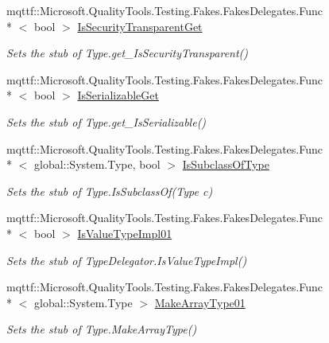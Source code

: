 \begin{DoxyCompactItemize}
mqttf\-::\-Microsoft.\-Quality\-Tools.\-Testing.\-Fakes.\-Fakes\-Delegates.\-Func\\*
$<$ bool $>$ \hyperlink{class_system_1_1_reflection_1_1_fakes_1_1_stub_type_delegator_a718557fd896385c5f7c66ffaca40c349}{Is\-Security\-Transparent\-Get}
\begin{DoxyCompactList}\small\item\em Sets the stub of Type.\-get\-\_\-\-Is\-Security\-Transparent()\end{DoxyCompactList}\item 
mqttf\-::\-Microsoft.\-Quality\-Tools.\-Testing.\-Fakes.\-Fakes\-Delegates.\-Func\\*
$<$ bool $>$ \hyperlink{class_system_1_1_reflection_1_1_fakes_1_1_stub_type_delegator_aa7c37e450e2ba2416e60ce81997560fb}{Is\-Serializable\-Get}
\begin{DoxyCompactList}\small\item\em Sets the stub of Type.\-get\-\_\-\-Is\-Serializable()\end{DoxyCompactList}\item 
mqttf\-::\-Microsoft.\-Quality\-Tools.\-Testing.\-Fakes.\-Fakes\-Delegates.\-Func\\*
$<$ global\-::\-System.\-Type, bool $>$ \hyperlink{class_system_1_1_reflection_1_1_fakes_1_1_stub_type_delegator_abc77039b362f40f6ed9e4a541727b085}{Is\-Subclass\-Of\-Type}
\begin{DoxyCompactList}\small\item\em Sets the stub of Type.\-Is\-Subclass\-Of(\-Type c)\end{DoxyCompactList}\item 
mqttf\-::\-Microsoft.\-Quality\-Tools.\-Testing.\-Fakes.\-Fakes\-Delegates.\-Func\\*
$<$ bool $>$ \hyperlink{class_system_1_1_reflection_1_1_fakes_1_1_stub_type_delegator_afe2432c06c1ecd3dc8f79b1c3e0975ae}{Is\-Value\-Type\-Impl01}
\begin{DoxyCompactList}\small\item\em Sets the stub of Type\-Delegator.\-Is\-Value\-Type\-Impl()\end{DoxyCompactList}\item 
mqttf\-::\-Microsoft.\-Quality\-Tools.\-Testing.\-Fakes.\-Fakes\-Delegates.\-Func\\*
$<$ global\-::\-System.\-Type $>$ \hyperlink{class_system_1_1_reflection_1_1_fakes_1_1_stub_type_delegator_afa2047ab4e96e11ecffc850f48543975}{Make\-Array\-Type01}
\begin{DoxyCompactList}\small\item\em Sets the stub of Type.\-Make\-Array\-Type()\end{DoxyCompactList}\item 

\end{DoxyCompactItemize}
